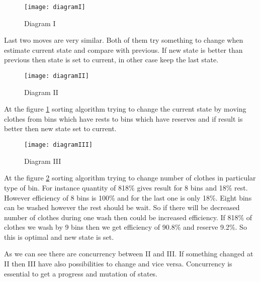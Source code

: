 \begin{figure}[h]
	\centering
		\texttt{[image: diagramI]}
	\caption{Diagram I}
	\label{fig:diagramI}
\end{figure}

Last two moves are very similar. Both of them try something to change when estimate current state and compare with previous. If new state is better than previous then state is set to current, in other case keep the last state.  \newpage

\begin{figure}[h]
	\centering
		\texttt{[image: diagramII]}
	\caption{Diagram II}
	\label{fig:diagramII}
\end{figure}

At the figure \ref{fig:diagramI} sorting algorithm trying to change the current state by moving clothes from bins which have rests to bins which have reserves and if result is better then new state set to current. 

\begin{figure}[h]
	\centering
		\texttt{[image: diagramIII]}
	\caption{Diagram III}
	\label{fig:diagramIII}
\end{figure}

At the figure \ref{fig:diagramII} sorting algorithm trying to change number of clothes in particular type of bin. For instance quantity of 818\% gives result for 8 bins and 18\% rest. However efficiency of 8 bins is 100\% and for the last one is only 18\%. Eight bins can be washed however the rest should be wait. So if there will be decreased number of clothes during one wash then could be increased efficiency. If 818\% of clothes we wash by 9 bins then we get efficiency of 90.8\% and reserve 9.2\%. So this is optimal and new state is set.

As we can see there are concurrency between II and III. If something changed at II then III have also possibilities to change and vice versa. Concurrency is essential to get a progress and mutation of states.